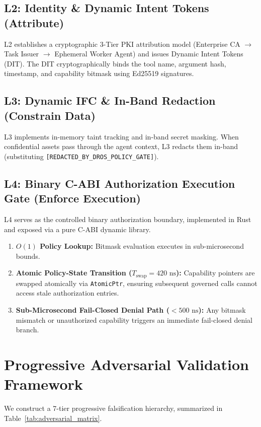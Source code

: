\documentclass[conference]{IEEEtran}
\begin{document}
\subsection{L2: Identity \& Dynamic Intent Tokens (Attribute)}
L2 establishes a cryptographic 3-Tier PKI attribution model (Enterprise CA $\rightarrow$ Task Issuer $\rightarrow$ Ephemeral Worker Agent) and issues Dynamic Intent Tokens (DIT). The DIT cryptographically binds the tool name, argument hash, timestamp, and capability bitmask using Ed25519 signatures.

\subsection{L3: Dynamic IFC \& In-Band Redaction (Constrain Data)}
L3 implements in-memory taint tracking and in-band secret masking. When confidential assets pass through the agent context, L3 redacts them in-band (substituting \texttt{[REDACTED\_BY\_DROS\_POLICY\_GATE]}).

\subsection{L4: Binary C-ABI Authorization Execution Gate (Enforce Execution)}
L4 serves as the controlled binary authorization boundary, implemented in Rust and exposed via a pure C-ABI dynamic library.
\begin{enumerate}
    \item \textbf{$O(1)$ Policy Lookup:} Bitmask evaluation executes in sub-microsecond bounds.
    \item \textbf{Atomic Policy-State Transition ($T_{\text{swap}} = 420\text{ ns}$):} Capability pointers are swapped atomically via \texttt{AtomicPtr}, ensuring subsequent governed calls cannot access stale authorization entries.
    \item \textbf{Sub-Microsecond Fail-Closed Denial Path ($<500\text{ ns}$):} Any bitmask mismatch or unauthorized capability triggers an immediate fail-closed denial branch.
\end{enumerate}

\section{Progressive Adversarial Validation Framework}
We construct a 7-tier progressive falsification hierarchy, summarized in Table~\ref{tab:adversarial_matrix}.
\end{document}
